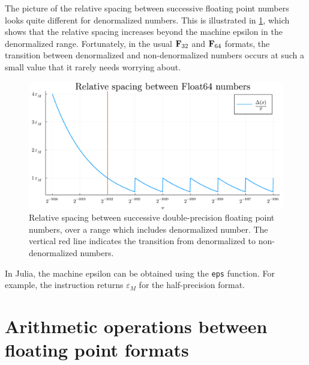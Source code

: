 The picture of the relative spacing between successive floating point numbers looks quite different for denormalized numbers.
This is illustrated in \cref{fig:float64_spacing_denormalized},
which shows that the relative spacing increases beyond the machine epsilon in the denormalized range.
Fortunately, in the usual $\mathbf F_{32}$ and $\mathbf F_{64}$ formats,
the transition between denormalized and non-denormalized numbers occurs at such a small value that
it rarely needs worrying about.

\begin{figure}[ht]
    \centering
    \includegraphics[width=.65\textwidth]{figures/float64_spacing_denormalized.pdf}
    \caption{%
        Relative spacing between successive double-precision floating point numbers,
        over a range which includes denormalized number.
        The vertical red line indicates the transition from denormalized to non-denormalized numbers.
    }%
    \label{fig:float64_spacing_denormalized}
\end{figure}

\begin{example}
    In Julia,
    the machine epsilon can be obtained using the \texttt{eps} function.
    For example, the instruction  returns $\varepsilon_M$ for the half-precision format.
\end{example}


\section{Arithmetic operations between floating point formats}%
\label{sec:arithmetic_operations_between_floating_point_formats}

